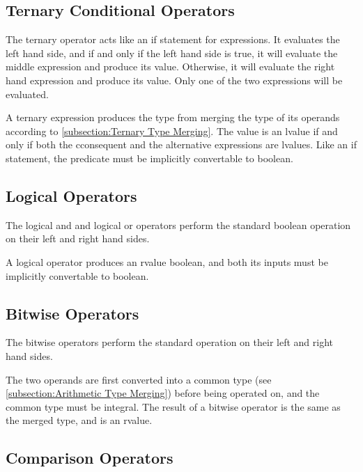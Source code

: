 \documentclass[letterpaper,12pt]{book}
\begin{document}
\subsection{Ternary Conditional Operators}



The ternary operator acts like an if statement for expressions. It evaluates the left hand side, and if and only if the left hand side is true, it will evaluate the middle expression and produce its value. Otherwise, it will evaluate the right hand expression and produce its value. Only one of the two expressions will be evaluated.

A ternary expression produces the type from merging the type of its operands according to \ref{subsection:Ternary Type Merging}. The value is an lvalue if and only if both the cconsequent and the alternative expressions are lvalues. Like an if statement, the predicate must be implicitly convertable to boolean.

\subsection{Logical Operators}



The logical and and logical or operators perform the standard boolean operation on their left and right hand sides.

A logical operator produces an rvalue boolean, and both its inputs must be implicitly convertable to boolean.

\subsection{Bitwise Operators}



The bitwise operators perform the standard operation on their left and right hand sides.

The two operands are first converted into a common type (see \ref{subsection:Arithmetic Type Merging}) before being operated on, and the common type must be integral. The result of a bitwise operator is the same as the merged type, and is an rvalue.

\subsection{Comparison Operators}
\end{document}
